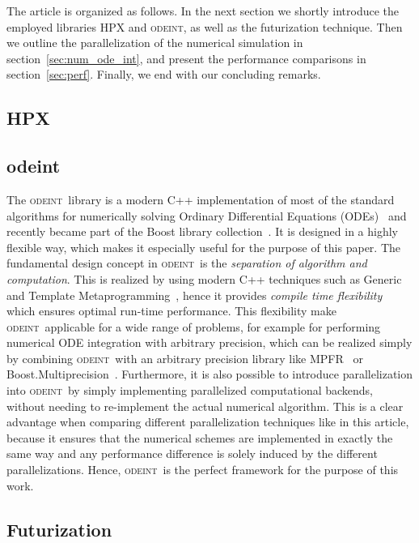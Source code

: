 \documentclass[10pt]{elsarticle}
\newcommand{\odeint}{\textsc{odeint}}
\begin{document}
The article is organized as follows.
In the next section we shortly introduce the employed libraries HPX and \odeint, as well as the futurization technique.
Then we outline the parallelization of the numerical simulation in section~\ref{sec:num_ode_int}, and present the performance comparisons in section~\ref{sec:perf}.
Finally, we end with our concluding remarks.

\subsection{HPX}

\subsection{odeint}

The \odeint\ library is a modern C++ implementation of most of the standard algorithms for numerically solving Ordinary Differential Equations (ODEs)~\cite{Ahnert_Mulansky_11} and recently became part of the Boost library collection~\cite{boost}.
It is designed in a highly flexible way, which makes it especially useful for the purpose of this paper.
The fundamental design concept in \odeint\ is the \emph{separation of algorithm and computation}.
This is realized by using modern C++ techniques such as Generic and Template Metaprogramming~\cite{TemplateMetaprogramming}, hence it provides \emph{compile time flexibility} which ensures optimal run-time performance.
This flexibility make \odeint\ applicable for a wide range of problems, for example for performing numerical ODE integration with arbitrary precision, which can be realized simply by combining \odeint\ with an arbitrary precision library like MPFR~\cite{mpfr} or Boost.Multiprecision~\cite{boost_multiprecision}.
Furthermore, it is also possible to introduce parallelization into \odeint\ by simply implementing parallelized computational backends, without needing to re-implement the actual numerical algorithm.
This is a clear advantage when comparing different parallelization techniques like in this article, because it ensures that the numerical schemes are implemented in exactly the same way and any performance difference is solely induced by the different parallelizations.
Hence, \odeint\ is the perfect framework for the purpose of this work.

\subsection{Futurization}
\end{document}
